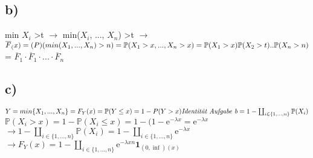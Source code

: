 \usepackage{amsmath, amssymb}

\subsection*{b)}
{min $X_i$ >t } $\rightarrow$ min($X_i$, ..., $X_n$) >t $\rightarrow$ $\overline{F}_(x) = \mathbb(P)(min(X_1,...,X_n) >n)= \mathbb{P}(X_1>x,...,X_n >x)\\ = \mathbb{P}(X_1 >x)\mathbb{P} (X_2 >t) .. \mathbb{P}(X_n>n)$\\ = $\overline{F}_1 \cdot \overline{F}_1 \cdot ... \cdot  \overline{F}_n $ 

\subsection{c)} $Y = min \{X_1, ..., X_n \} = F_Y(x)=\mathbb{P}(Y \leq x) = 1 - P(Y >x)\\\textit{Identität Aufgabe b} \\= 1- \coprod_{i \in  \{1,...,n\}} \mathbb{P}(X_i) $ \\
$\mathbb{P}(X_i>x)=1 - \mathbb{P}(X_i \leq x) = 1 - (1 - \mathrm{e}^{-\lambda x} = \mathrm{e}^{-\lambda x} $\\
$\rightarrow 1- \coprod_{i \in  \{1,...,n\}} \mathbb{P}(X_i) = 1- \coprod_{i \in  \{1,...,n\}} \mathrm{e}^{-\lambda x}  $ \\
$\rightarrow F_Y(x)= 1 -\coprod_{i \in  \{1,...,n\}} \mathrm{e}^{-\lambda x n} \textbf{1}_{(0, \inf) (x)  }  $
	